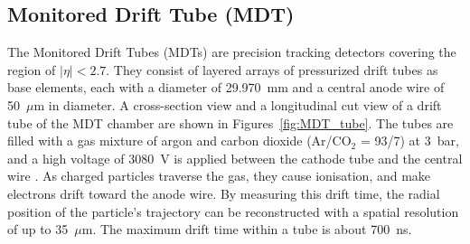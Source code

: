 \subsection{Monitored Drift Tube (MDT)}
The Monitored Drift Tubes (MDTs) are precision tracking detectors covering the region of $|\eta| < 2.7$. They consist of layered arrays of pressurized drift tubes as base elements, each with a diameter of 29.970~mm and a central anode wire of 50~$\mu$m in diameter. A cross-section view and a longitudinal cut view of a drift tube of the MDT chamber are shown in Figures~\ref{fig:MDT_tube}. The tubes are filled with a gas mixture of argon and carbon dioxide (Ar/CO$_2$ = 93/7) at 3~bar, and a high voltage of 3080~V is applied between the cathode tube and the central wire \cite{ATLASDetector2008}. As charged particles traverse the gas, they cause ionisation, and make electrons drift toward the anode wire. By measuring this drift time, the radial position of the particle's trajectory can be reconstructed with a spatial resolution of up to 35~$\mu$m. The maximum drift time within a tube is about 700~ns.

